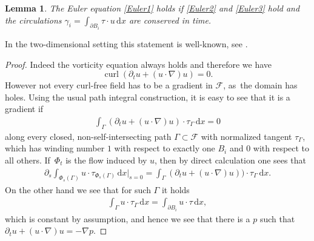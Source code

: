\documentclass[JEP,XML,SOM,Unicode,published]{cedram}
\newtheorem{lemma}[theorem]{Lemma}
\theoremstyle{definition}
\DeclareMathOperator{\curl}{curl}
\newcommand\eq{=}
\newcommand\dd{\,\mathrm{d}}
\newcommand\dx{\dd x}
\let\de\partial
\begin{document}
\begin{lemma}\label{rot pre}
The Euler equation \eqref{Euler1} holds if \eqref{Euler2} and \eqref{Euler3} hold and the circulations $\gamma_i=\int_{\de B_i}\tau\cdot u\dx$ are conserved in time.
\end{lemma}
In the two-dimensional setting this statement is well-known, see \eg \cite{filho2007vortex}.

\begin{proof}
Indeed the vorticity equation always holds and therefore we have
\[
\curl(\de_t u+(u\cdot \nabla)u)=0.
\]
However not every curl-free field has to be a gradient in $\mathcal{F}$, as~the domain has holes. Using the usual path integral construction, it is easy to see that it is a gradient if
\begin{align*}
\int_\Gamma (\de_tu+(u\cdot \nabla)u)\cdot \tau_\Gamma\dx\eq0
\end{align*}
along every closed, non-self-intersecting path $\Gamma\subset \mathcal{F}$ with normalized tangent $\tau_\Gamma$, which has winding number $1$ with respect to exactly one $B_i$ and $0$ with respect to all others. If~$\Phi_t$ is the flow induced by $u$, then by direct calculation one sees that
\begin{align*}
\de_s\int_{\Phi_s(\Gamma)}u\cdot\tau_{\Phi_s(\Gamma)}\dx\big|_{s=0}\eq\int_\Gamma (\de_tu+(u\cdot \nabla)u))\cdot \tau_\Gamma\dx.
\end{align*}
On the other hand we see that for such $\Gamma$ it holds
\begin{align*}
\int_\Gamma u\cdot\tau_\Gamma\dx\eq\int_{\de B_i} u\cdot\tau\dx,
\end{align*}
which is constant by assumption, and hence we see that there is a $p$ such that \hbox{$\de_t u+(u\cdot\nabla)u=-\nabla p$}.
\end{proof}
\end{document}
